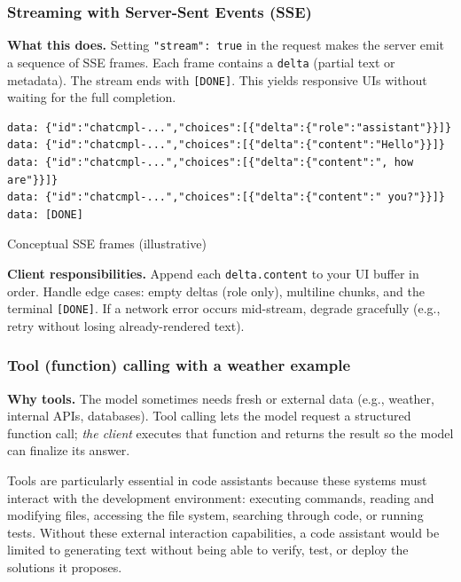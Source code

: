 \documentclass[english]{article}
\begin{document}
\subsubsection{Streaming with Server-Sent Events (SSE)}

\noindent\textbf{What this does.}
Setting \texttt{"stream": true} in the request makes the server emit a sequence of SSE frames. Each frame contains a \texttt{delta} (partial text or metadata). The stream ends with \texttt{[DONE]}. This yields responsive UIs without waiting for the full completion.

\begin{listing}[H]
\begin{verbatim}
data: {"id":"chatcmpl-...","choices":[{"delta":{"role":"assistant"}}]}
data: {"id":"chatcmpl-...","choices":[{"delta":{"content":"Hello"}}]}
data: {"id":"chatcmpl-...","choices":[{"delta":{"content":", how are"}}]}
data: {"id":"chatcmpl-...","choices":[{"delta":{"content":" you?"}}]}
data: [DONE]
\end{verbatim}
\caption{Conceptual SSE frames (illustrative)}
\end{listing}

\noindent\textbf{Client responsibilities.}
Append each \texttt{delta.content} to your UI buffer in order. Handle edge cases: empty deltas (role only), multiline chunks, and the terminal \texttt{[DONE]}. If a network error occurs mid-stream, degrade gracefully (e.g., retry without losing already-rendered text).

\subsubsection{Tool (function) calling with a weather example}

\noindent\textbf{Why tools.}
The model sometimes needs fresh or external data (e.g., weather, internal APIs, databases). Tool calling lets the model request a structured function call; \emph{the client} executes that function and returns the result so the model can finalize its answer.

Tools are particularly essential in code assistants because these systems must interact with the development environment: executing commands, reading and modifying files, accessing the file system, searching through code, or running tests. Without these external interaction capabilities, a code assistant would be limited to generating text without being able to verify, test, or deploy the solutions it proposes.
\end{document}
